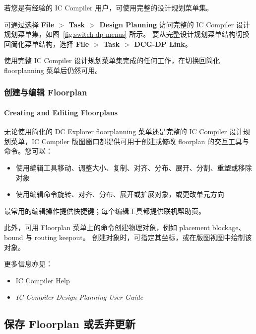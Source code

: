
若您是有经验的 IC Compiler 用户，可使用完整的设计规划菜单集。

可通过选择 \textbf{File $>$ Task $>$ Design Planning} 访问完整的 IC Compiler 设计规划菜单集，如图~\ref{fig:switch-dp-menus} 所示。
要从完整设计规划菜单结构切换回简化菜单结构，选择 \textbf{File $>$ Task $>$ DCG-DP Link}。


使用完整 IC Compiler 设计规划菜单集完成的任何工作，在切换回简化 floorplanning 菜单后仍然可用。

\subsubsection{创建与编辑 Floorplan}
\paragraph*{Creating and Editing Floorplans}

无论使用简化的 DC Explorer floorplanning 菜单还是完整的 IC Compiler 设计规划菜单，IC Compiler 版图窗口都提供可用于创建或修改 floorplan 的交互工具与命令。您可以：
\begin{itemize}
  \item 使用编辑工具移动、调整大小、复制、对齐、分布、展开、分割、重塑或移除对象
  \item 使用编辑命令旋转、对齐、分布、展开或扩展对象，或更改单元方向
\end{itemize}

最常用的编辑操作提供快捷键；每个编辑工具都提供联机帮助页。

此外，可用 Floorplan 菜单上的命令创建物理对象，例如 placement blockage、bound 与 routing keepout。
创建对象时，可指定其坐标，或在版图视图中绘制该对象。

更多信息亦见：
\begin{itemize}
  \item IC Compiler Help
  \item \textit{IC Compiler Design Planning User Guide}
\end{itemize}

\subsection{保存 Floorplan 或丢弃更新}
